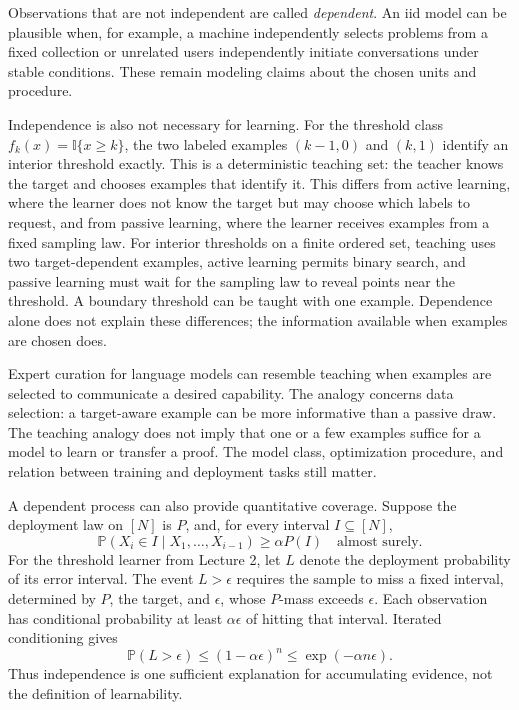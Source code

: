 \documentclass[11pt,twoside]{article}
\newcommand{\I}{\mathbb I}
\renewcommand{\P}{\mathbb P}
\theoremstyle{definition}
\theoremstyle{remark}
\begin{document}
Observations that are not independent are called \emph{dependent}. An iid
model can be plausible when, for example, a machine independently selects
problems from a fixed collection or unrelated users independently initiate
conversations under stable conditions. These remain modeling claims about the
chosen units and procedure.

Independence is also not necessary for learning. For the threshold class
\(f_k(x)=\I\{x\geq k\}\), the two labeled examples
\((k-1,0)\) and \((k,1)\) identify an interior threshold exactly. This is a
deterministic teaching set: the teacher knows the target and chooses examples
that identify it. This differs from active learning, where the learner does not
know the target but may choose which labels to request, and from passive
learning, where the learner receives examples from a fixed sampling law. For
interior thresholds on a finite ordered set, teaching uses two target-dependent
examples, active learning permits binary search, and passive learning must wait
for the sampling law to reveal points near the threshold. A boundary threshold
can be taught with one example. Dependence alone does not explain these
differences; the information available when examples are chosen does.

Expert curation for language models can resemble teaching when examples are
selected to communicate a desired capability. The analogy concerns data
selection: a target-aware example can be more informative than a passive draw.
The teaching analogy does not imply that one or a few examples suffice for a model to learn or
transfer a proof. The model class, optimization procedure, and relation between
training and deployment tasks still matter.

A dependent process can also provide quantitative coverage. Suppose the
deployment law on \([N]\) is \(P\), and, for every interval \(I\subseteq[N]\),
\begin{equation}
 \P(X_i\in I\mid X_1,\ldots,X_{i-1})\geq \alpha P(I)
 \quad\text{almost surely}.
 \label{eq:conditional-coverage}
\end{equation}
For the threshold learner from Lecture 2, let \(L\) denote the deployment
probability of its error interval. The event \(L>\epsilon\) requires the sample
to miss a fixed interval, determined by \(P\), the target, and \(\epsilon\),
whose \(P\)-mass exceeds \(\epsilon\). Each observation has conditional
probability at least \(\alpha\epsilon\) of hitting that interval. Iterated
conditioning gives
\begin{equation}
 \P(L>\epsilon)
 \leq (1-\alpha\epsilon)^n
 \leq \exp(-\alpha n\epsilon).
 \label{eq:conditional-coverage-bound}
\end{equation}
Thus independence is one sufficient explanation for accumulating evidence,
not the definition of learnability.
\end{document}
